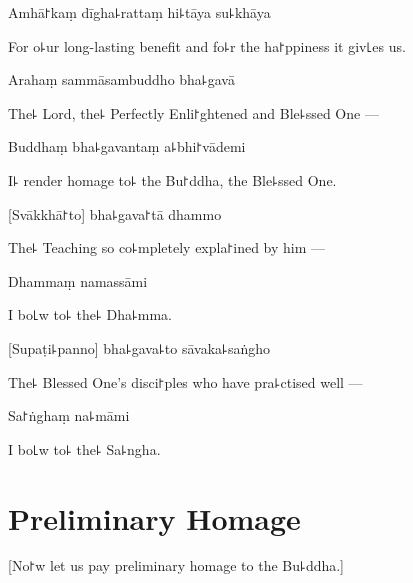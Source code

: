 Amhā꜓kaṃ dīgha꜕rattaṃ hi꜕tāya su꜕khāya

\begin{english}
For o꜕ur long-lasting benefit and fo꜕r the ha꜓ppiness it giv꜖es us.
\end{english}

\clearpage

Arahaṃ sammāsambuddho bha꜕gavā              %

\begin{english}
The꜕ Lord, the꜕ Perfectly Enli꜓ghtened and Ble꜕ssed One ---
\end{english}

Buddhaṃ bha꜕gavantaṃ a꜕bhi꜓vādemi

\begin{english}
  I꜕ render homage to꜕ the Bu꜓ddha, the Ble꜕ssed One.
\end{english}

[Svākkhā꜓to] bha꜕gava꜓tā dhammo

\begin{english}
  The꜕ Teaching so co꜕mpletely expla꜓ined by him ---
\end{english}

Dhammaṃ namassāmi

\begin{english}
  I bo꜖w to꜕ the꜕ Dha꜕mma.
\end{english}

[Supaṭi꜕panno] bha꜕gava꜕to sāvaka꜕saṅgho

\begin{english}
The꜕ Blessed One's disci꜓ples who have pra꜕ctised well ---
\end{english}

Sa꜓ṅghaṃ na꜕māmi

\begin{english}
  I bo꜖w to꜕ the꜕ Sa꜕ngha.
\end{english}

\chapter{Preliminary Homage}            %

\begin{leader}
\end{leader}

\begin{english}
  [No꜓w let us pay preliminary homage to the Bu꜕ddha.]
\end{english}

